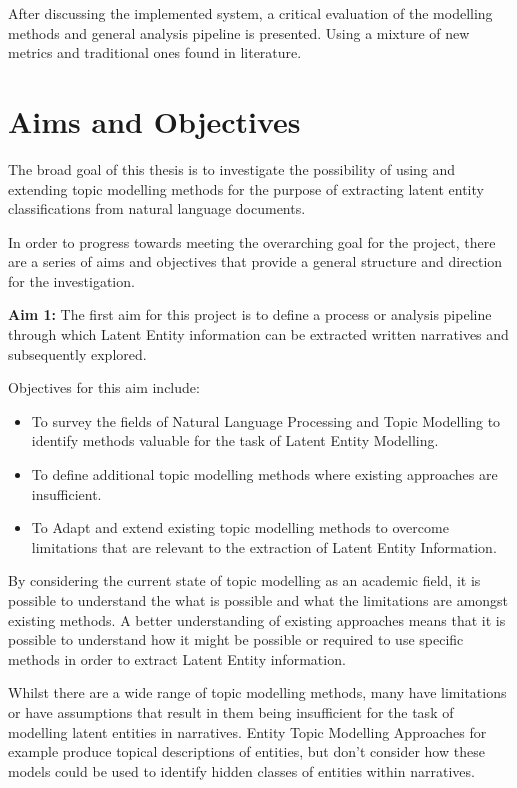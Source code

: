 \documentclass[10pt]{report}
\begin{document}
After discussing the implemented system, a critical evaluation of the modelling methods and general analysis pipeline is presented. Using a mixture of new metrics and traditional ones found in literature.

\section{Aims and Objectives}

The broad goal of this thesis is to investigate the possibility of using and extending topic modelling methods for the purpose of extracting latent entity classifications from natural language documents.

In order to progress towards meeting the overarching goal for the project, there are a series of aims and objectives that provide a general structure and direction for the investigation.


\textbf{Aim 1:} The first aim for this project is to define a process or analysis pipeline through which Latent Entity information can be extracted written narratives and subsequently explored.

\renewcommand{\baselinestretch}{1.0}\normalsize
Objectives for this aim include:
\begin{itemize}
\item To survey the fields of Natural Language Processing and Topic Modelling to identify methods valuable for the task of Latent Entity Modelling.
\item To define additional topic modelling methods where existing approaches are insufficient.
\item To Adapt and extend existing topic modelling methods to overcome limitations that are relevant to the extraction of Latent Entity Information.
\end{itemize}
\renewcommand{\baselinestretch}{2.0}\normalsize

By considering the current state of topic modelling as an academic field, it is possible to understand the what is possible and what the limitations are amongst existing methods. A better understanding of existing approaches means that it is possible to understand how it might be possible or required to use specific methods in order to extract Latent Entity information.

Whilst there are a wide range of topic modelling methods, many have limitations or have assumptions that result in them being insufficient for the task of modelling latent entities in narratives. Entity Topic Modelling Approaches for example produce topical descriptions of entities, but don't consider how these models could be used to identify hidden classes of entities within narratives.
\end{document}
